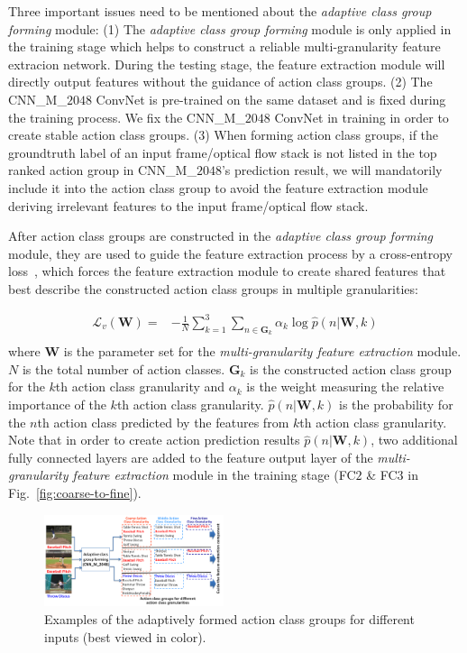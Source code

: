 \documentclass[letterpaper]{article}
\begin{document}
Three important issues need to be mentioned about the \emph{adaptive class group forming} module: (1) The \emph{adaptive class group forming} module is only applied in the training stage which helps to construct a reliable multi-granularity feature extracion network. During the testing stage, the feature extraction module will directly output features without the guidance of action class groups. (2) The CNN\_M\_$2048$ ConvNet is pre-trained on the same dataset and is fixed during the training process. We fix the CNN\_M\_$2048$ ConvNet in training in order to create stable action class groups. (3) When forming action class groups, if the groundtruth label of an input frame/optical flow stack is not listed in the top ranked action group in CNN\_M\_$2048$'s prediction result, we will mandatorily include it into the action class group to avoid the feature extraction module deriving irrelevant features to the input frame/optical flow stack.

After action class groups are constructed in the \emph{adaptive class group forming} module, they are used to guide the feature extraction process by a cross-entropy loss~\cite{crossentropy}, which forces the feature extraction module to create shared features that best describe the constructed action class groups in multiple granularities:

\begin{equation}
\begin{aligned}
\mathcal{L}_v(\mathbf{W})=&-\frac{1}{N}\sum_{k=1}^{3}\sum_{n\in \mathbf{G}_k}{{\alpha }_{k}\log{\hat{p}(n|\mathbf{W},k)}}\\
\end{aligned}
\label{equation:equ0}
\end{equation}
where $\mathbf{W}$ is the parameter set for the \emph{multi-granularity feature extraction} module. $N$ is the total number of action classes. $\mathbf{G}_k$ is the constructed action class group for the $k$th action class granularity and ${\alpha }_{k}$ is the weight measuring the relative importance of the $k$th action class granularity. $\hat{p}(n|\mathbf{W},k)$ is the probability for the $n$th action class predicted by the features from $k$th action class granularity. Note that in order to create action prediction results $\hat{p}(n|\mathbf{W},k)$, two additional fully connected layers are added to the feature output layer of the \emph{multi-granularity feature extraction} module in the training stage (FC$2$ \& FC$3$ in Fig.~\ref{fig:coarse-to-fine}).


\begin{figure}
  \centering
  \includegraphics[width=0.47\textwidth,height=0.28\textwidth]{./figures1/action_class.png}
  \caption{Examples of the adaptively formed action class groups for different inputs (best viewed in color).}
    \label{fig:action-class}
\end{figure}
\end{document}
